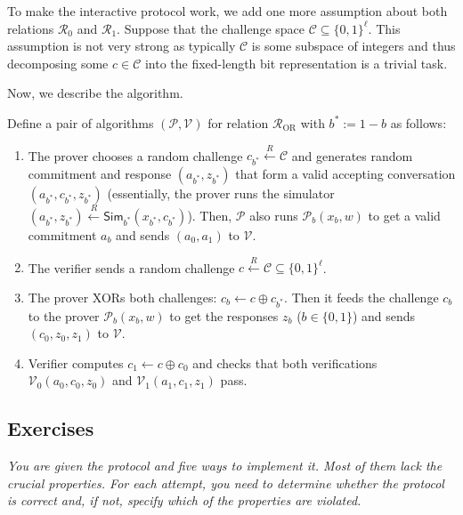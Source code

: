 \documentclass[../lecture-notes-105x135.tex]{subfiles}
\begin{document}
To make the interactive protocol work, we add one more assumption about both relations $\mathcal{R}_0$ and $\mathcal{R}_1$. Suppose that the challenge space $\mathcal{C} \subseteq \{0,1\}^{\ell}$. This assumption is not very strong as typically $\mathcal{C}$ is some subspace of integers and thus decomposing some $c \in \mathcal{C}$ into the fixed-length bit representation is a trivial task.

Now, we describe the algorithm.

\begin{definition}
    Define a pair of algorithms $(\mathcal{P},\mathcal{V})$ for relation $\mathcal{R}_{\text{OR}}$ with $b^* := 1-b$ as follows:
    \begin{enumerate}
        \item The prover chooses a random challenge $c_{b^*} \xleftarrow{R} \mathcal{C}$ and generates random commitment and response $(a_{b^*}, z_{b^*})$ that form a valid accepting conversation $(a_{b^*}, c_{b^*}, z_{b^*})$ (essentially, the prover runs the simulator $(a_{b^*}, z_{b^*}) \xleftarrow{R} \mathsf{Sim}_{b^*}(x_{b^*}, c_{b^*})$). Then, $\mathcal{P}$ also runs $\mathcal{P}_b(x_b, w)$ to get a valid commitment $a_b$ and sends $(a_0,a_1)$ to $\mathcal{V}$.
        \item The verifier sends a random challenge $c \xleftarrow{R} \mathcal{C} \subseteq \{0,1\}^{\ell}$.
        \item The prover XORs both challenges: $c_b \gets c \oplus c_{b^*}$. Then it feeds the challenge $c_b$ to the prover $\mathcal{P}_b(x_b,w)$ to get the responses $z_b$ ($b \in \{0,1\}$) and sends $(c_0,z_0,z_1)$ to $\mathcal{V}$.
        \item Verifier computes $c_1 \gets c \oplus c_0$ and checks that both verifications $\mathcal{V}_0(a_0,c_0,z_0)$ and $\mathcal{V}_1(a_1,c_1,z_1)$ pass.
    \end{enumerate}
\end{definition}

\newpage

\subsection*{Exercises}

    \textit{You are given the protocol and five ways to implement it. Most of them lack the crucial properties. For each attempt, you need to determine whether the protocol is correct and, if not, specify which of the properties are violated.}
 
\end{document}
